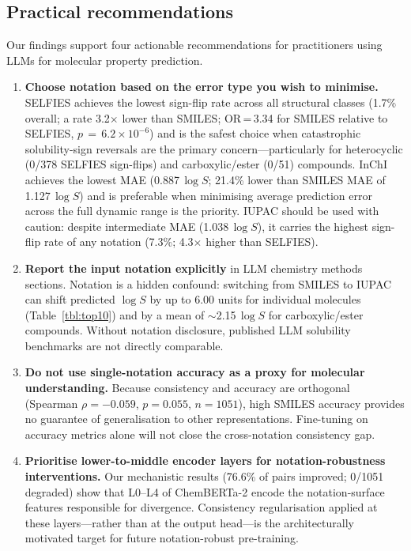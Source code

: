 \documentclass[twoside,twocolumn,9pt]{article}
\newcommand{\logS}{\ensuremath{\log S}}
\begin{document}
\subsection{Practical recommendations}

Our findings support four actionable recommendations for practitioners using LLMs for molecular property prediction.

\begin{enumerate}
\item \textbf{Choose notation based on the error type you wish to minimise.} SELFIES achieves the lowest sign-flip rate across all structural classes (1.7\% overall; a rate 3.2$\times$ lower than SMILES; OR\,=\,3.34 for SMILES relative to SELFIES, $p\,=\,6.2\!\times\!10^{-6}$) and is the safest choice when catastrophic solubility-sign reversals are the primary concern---particularly for heterocyclic (0/378 SELFIES sign-flips) and carboxylic/ester (0/51) compounds. InChI achieves the lowest MAE (0.887\,$\logS$; 21.4\% lower than SMILES MAE of 1.127\,$\logS$) and is preferable when minimising average prediction error across the full dynamic range is the priority. IUPAC should be used with caution: despite intermediate MAE (1.038\,$\logS$), it carries the highest sign-flip rate of any notation (7.3\%; 4.3$\times$ higher than SELFIES).
\item \textbf{Report the input notation explicitly} in LLM chemistry methods sections. Notation is a hidden confound: switching from SMILES to IUPAC can shift predicted $\logS$ by up to 6.00 units for individual molecules (Table~\ref{tbl:top10}) and by a mean of $\sim$2.15\,$\logS$ for carboxylic/ester compounds. Without notation disclosure, published LLM solubility benchmarks are not directly comparable.
\item \textbf{Do not use single-notation accuracy as a proxy for molecular understanding.} Because consistency and accuracy are orthogonal (Spearman $\rho=-0.059$, $p=0.055$, $n=1051$), high SMILES accuracy provides no guarantee of generalisation to other representations. Fine-tuning on accuracy metrics alone will not close the cross-notation consistency gap.
\item \textbf{Prioritise lower-to-middle encoder layers for notation-robustness interventions.} Our mechanistic results (76.6\% of pairs improved; 0/1051 degraded) show that L0--L4 of ChemBERTa-2 encode the notation-surface features responsible for divergence. Consistency regularisation applied at these layers---rather than at the output head---is the architecturally motivated target for future notation-robust pre-training.
\end{enumerate}
\end{document}
